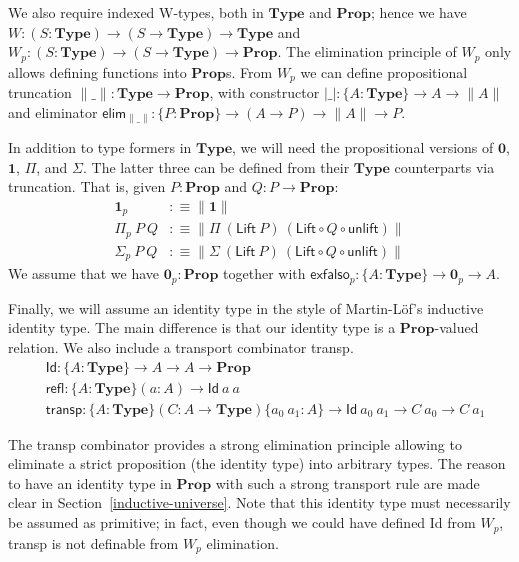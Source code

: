 \documentclass{easychair}
\newcommand{\mType}{\mathbf{Type}}
\newcommand{\mProp}{\mathbf{Prop}}
\begin{document}
We also require indexed W-types, both in $\mType$ and $\mProp$; hence we have $W
: (S : \mType) \to (S \to \mType) \to \mType$ and $W_p : (S : \mType) \to (S \to
\mType) \to \mProp$. The elimination principle of $W_p$ only allows defining functions into $\mProp$s.
%
From $W_p$ we can define propositional truncation $\|\_\| : \mType \to \mProp$, with constructor
  $|\_| : \{A : \mType \} \to A \to \| A \|$ and eliminator
  $\textsf{elim}_{\|\_\|} : \{P : \mProp \} \to (A \to P) \to \| A \| \to P$.

In addition to type formers in $\mType$, we will need the propositional versions
of $\mathbf{0}$, $\mathbf{1}$, $\Pi$, and $\Sigma$. The latter three can be defined from their
$\mType$ counterparts via truncation. That is, given $P : \mProp$ and $Q : P \to
\mProp$:
%
\begin{align*}
  \mathbf{1}_p & :\equiv \| \mathbf{1} \| \\
  \Pi_p\ P\ Q & :\equiv \| \Pi\ (\textsf{Lift} \ P)\ (\textsf{Lift} \circ Q \circ \textsf{unlift}) \| \\
  \Sigma_p\ P\ Q & :\equiv \| \Sigma\ (\textsf{Lift} \ P)\ (\textsf{Lift} \circ Q \circ \textsf{unlift}) \|
\end{align*}
We assume that we have
$\mathbf{0}_p:\mProp$ together with $\mathsf{exfalso}_p :\{A:\mType \} \to \mathbf{0}_p \to A$.

Finally, we will assume an identity type in the style of Martin-L\"of's
inductive identity type. The main difference is that our identity type is a
$\mProp$-valued relation. We also include a transport combinator
\textsf{transp}.
%
\begin{align*}
  & \textsf{Id} : \{A : \mType \} \to A \to A \to \mProp \\
  & \textsf{refl} : \{A : \mType \} (a : A) \to \textsf{Id}\ a\ a \\
  & \textsf{transp} : \{A : \mType \} (C : A \to \mType) \{a_0\ a_1 : A\} \to \textsf{Id}\ a_0\ a_1 \to C\ a_0 \to C\ a_1
\end{align*}

The \textsf{transp} combinator provides a strong elimination principle allowing
to eliminate a strict proposition (the identity type) into arbitrary types.
%
The reason to have an identity type in $\mProp$ with such a strong transport
rule are made clear in Section~\ref{inductive-universe}.
%
Note that this identity type must necessarily be assumed as primitive; in fact,
even though we could have defined \textsf{Id} from $W_p$, \textsf{transp} is not
definable from $W_p$ elimination.
\end{document}
